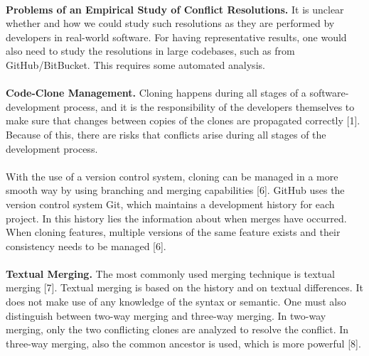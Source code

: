 \paragraph*{}
\textbf{Problems of an Empirical Study of Conflict Resolutions.} It is unclear whether and how we could study such resolutions as they are performed by developers in real-world software. For having representative results, one would also need to study the resolutions in large codebases, such as from GitHub/BitBucket. This requires some automated analysis.

\paragraph*{}
\textbf{Code-Clone Management.} Cloning happens during all stages of a software-development process, and it is the responsibility of the developers themselves to make sure that changes between copies of the clones are propagated correctly [1]. Because of this, there are risks that conflicts arise during all stages of the development process.

\paragraph*{}
With the use of a version control system, cloning can be managed in a more smooth way by using branching and merging capabilities [6]. GitHub uses the version control system Git, which maintains a development history for each project. In this history lies the information about when merges have occurred. When cloning features, multiple versions of the same feature exists and their consistency needs to be managed [6].

\paragraph*{}
\textbf{Textual Merging.} The most commonly used merging technique is textual merging [7]. Textual merging is based on the history and on textual differences. It does not make use of any knowledge of the syntax or semantic. One must also distinguish between two-way merging and three-way merging. In two-way merging, only the two conflicting clones are analyzed to resolve the conflict. In three-way merging, also the common ancestor is used, which is more powerful [8].

